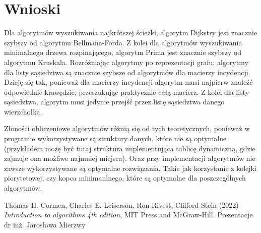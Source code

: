 \documentclass[11pt]{article}
\begin{document}
\section{Wnioski}

Dla algorytmów wyszukiwania najkrótszej ścieżki, algorytm Dijkstry jest znacznie szybszy od algorytmu Bellmana-Forda.
Z kolei dla algorytmów wyszukiwania minimalnego drzewa rozpinającego, algorytm Prima jest znacznie szybszy od algorytmu Kruskala.
Rozróżniając algorytmy po reprezentacji grafu, algorytmy dla listy sąsiedztwa są znacznie szybsze od algorytmów dla macierzy incydencji.
Dzieję się tak, ponieważ dla macierzy incydencji algorytm musi najpierw znaleźć odpowiednie krawędzie, przeszukując praktycznie całą macierz.
Z kolei dla listy sąsiedztwa, algorytm musi jedynie przejść przez listę sąsiedztwa danego wierzchołka.

Złoności obliczeniowe algorytmów różnią się od tych teoretycznych, ponieważ w programie wykorzystywane są struktury danych, które nie są optymalne (przykładem możę być tutaj struktura implementująca tablicę dynamiczną, gdzie zajmuje ona możliwe najmniej miejsca). Oraz przy implementacji algorytmów nie zawsze wykorzystywane są optymalne rozwiązania.
Takie jak korzystanie z kolejki piorytetowej, czy kopca minimanlnego, które są optymalne dla poszczególnych algorytmów.

\begin{thebibliography}{9}
    Thomas H. Cormen, Charles E. Leiserson, Ron Rivest, Clifford Stein (2022) \emph{Introduction to algorithms 4th edition}, MIT Press and McGraw-Hill.
    Prezentacje dr inż. Jarosława Mierzwy
\end{thebibliography}
\end{document}
